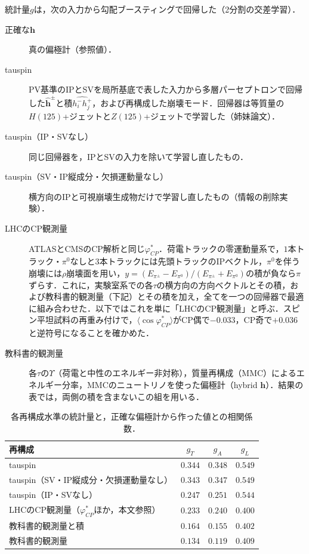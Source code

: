 \documentclass[paper=a4,fontsize=10pt,jafontsize=10pt,line_length=44zw,number_of_lines=46]{jlreq}
\newcommand{\hvec}{\boldsymbol{h}}
\newcommand{\phicp}{\varphi^{*}_{CP}}
\begin{document}
統計量$g$は，次の入力から勾配ブースティング\cite{Pedregosa:2011}で回帰した（2分割の交差学習）．
\begin{description}
  \item[正確な$\hvec$] 真の偏極計（参照値）．
  \item[tauspin] PV基準のIPとSVを局所基底で表した入力から多層パーセプトロンで回帰した$\hat{\hvec}^\pm$と積$\widehat{h^-_ih^+_j}$，および再構成した崩壊モード．回帰器は等質量の$H(125)$+ジェットと$Z(125)$+ジェットで学習した（姉妹論文\cite{dihiggs:paper}）．
  \item[tauspin（IP・SVなし）] 同じ回帰器を，IPとSVの入力を除いて学習し直したもの．
  \item[tauspin（SV・IP縦成分・欠損運動量なし）] 横方向のIPと可視崩壊生成物だけで学習し直したもの（情報の削除実験）．
  \item[LHCのCP観測量] ATLASとCMSのCP解析と同じ$\phicp$．荷電トラックの零運動量系で，$1$本トラック・$\pi^0$なしと3本トラックには先頭トラックのIPベクトル，$\pi^0$を伴う崩壊には$\rho$崩壊面を用い，$y=(E_{\pi^\pm}-E_{\pi^0})/(E_{\pi^\pm}+E_{\pi^0})$の積が負なら$\pi$ずらす．これに，実験室系での各$\tau$の横方向の方向ベクトルとその積，および教科書的観測量（下記）とその積を加え，全てを一つの回帰器で最適に組み合わせた．以下ではこれを単に「LHCのCP観測量」と呼ぶ．スピン平坦試料の再重み付けで，$\langle\cos\phicp\rangle$がCP偶で$-0.033$，CP奇で$+0.036$と逆符号になることを確かめた．
  \item[教科書的観測量] 各$\tau$の$\Upsilon$（荷電と中性のエネルギー非対称），質量再構成（MMC）\cite{Elagin:2010aw}によるエネルギー分率，MMCのニュートリノを使った偏極計（hybrid $\hvec$）．結果の表では，両側の積を含まないこの組を用いる．
\end{description}

\begin{table}[t]
  \centering
  \caption{各再構成水準の統計量と，正確な偏極計から作った値との相関係数．}
  \label{tab:corr}
  \begin{tabular}{lccc}
    \toprule
    再構成 & $g_T$ & $g_A$ & $g_L$ \\
    \midrule
    tauspin & $0.344$ & $0.348$ & $0.549$ \\
    tauspin（SV・IP縦成分・欠損運動量なし） & $0.343$ & $0.347$ & $0.549$ \\
    tauspin（IP・SVなし） & $0.247$ & $0.251$ & $0.544$ \\
    LHCのCP観測量（$\phicp$ほか，本文参照） & $0.233$ & $0.240$ & $0.400$ \\
    教科書的観測量と積 & $0.164$ & $0.155$ & $0.402$ \\
    教科書的観測量 & $0.134$ & $0.119$ & $0.409$ \\
    \bottomrule
  \end{tabular}
\end{table}
\end{document}
